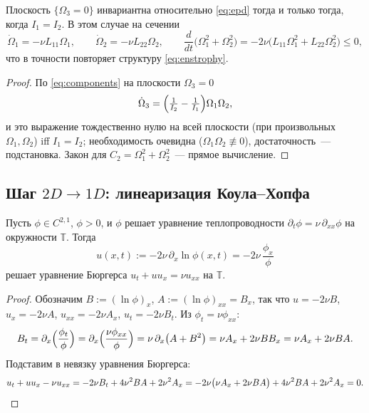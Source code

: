 \begin{proposition}\label{prop:2dplane}
Плоскость $\{\Omega_3 = 0\}$ инвариантна относительно \eqref{eq:epd}
тогда и только тогда, когда $I_1 = I_2$. В этом случае на сечении
\[
  \dot\Omega_1 = -\nu L_{11}\Omega_1,\qquad
  \dot\Omega_2 = -\nu L_{22}\Omega_2,\qquad
  \frac{d}{dt}\bigl(\Omega_1^2+\Omega_2^2\bigr)
  = -2\nu\bigl(L_{11}\Omega_1^2 + L_{22}\Omega_2^2\bigr) \le 0,
\]
что в точности повторяет структуру \eqref{eq:enstrophy}.
\end{proposition}

\begin{proof}
По \eqref{eq:components} на плоскости $\Omega_3 = 0$
\[
  \dot\Omega_3 = \Bigl(\tfrac1{I_2}-\tfrac1{I_1}\Bigr)\Omega_1\Omega_2 ,
\]
и это выражение тождественно нулю на всей плоскости (при произвольных
$\Omega_1, \Omega_2$) iff $I_1 = I_2$; необходимость очевидна
($\Omega_1\Omega_2 \not\equiv 0$), достаточность~--- подстановка.
Закон для $C_2 = \Omega_1^2+\Omega_2^2$~--- прямое вычисление.
\end{proof}

\subsection{Шаг $2D \to 1D$: линеаризация Коула--Хопфа}

\begin{theorem}\label{th:colehopf}
Пусть $\phi \in C^{2,1}$, $\phi > 0$, и $\phi$ решает уравнение
теплопроводности $\partial_t\phi = \nu\,\partial_{xx}\phi$ на окружности
$\mathbb T$. Тогда
\begin{equation}\label{eq:colehopf}
  u(x,t) := -2\nu\,\partial_x\ln\phi(x,t) = -2\nu\,\frac{\phi_x}{\phi}
\end{equation}
решает уравнение Бюргерса $u_t + uu_x = \nu u_{xx}$ на $\mathbb T$.
\end{theorem}

\begin{proof}
Обозначим $B := (\ln\phi)_x$, $A := (\ln\phi)_{xx} = B_x$, так что
$u = -2\nu B$, $u_x = -2\nu A$, $u_{xx} = -2\nu A_x$,
$u_t = -2\nu B_t$. Из $\phi_t = \nu\phi_{xx}$:
\[
  B_t = \partial_x\Bigl(\frac{\phi_t}{\phi}\Bigr)
      = \partial_x\Bigl(\frac{\nu\phi_{xx}}{\phi}\Bigr)
      = \nu\,\partial_x\bigl(A + B^2\bigr)
      = \nu A_x + 2\nu B B_x = \nu A_x + 2\nu B A .
\]
Подставим в невязку уравнения Бюргерса:
\[
  u_t + uu_x - \nu u_{xx}
  = -2\nu B_t + 4\nu^2 BA + 2\nu^2 A_x
  = -2\nu\bigl(\nu A_x + 2\nu BA\bigr) + 4\nu^2 BA + 2\nu^2 A_x = 0.
  \qedhere
\]
\end{proof}

